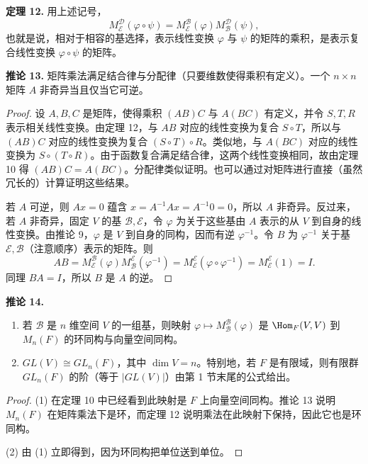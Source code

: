 \noindent\textbf{定理 12.} 用上述记号，
\[
M_{\mathcal E}^{\mathcal D}(\varphi\circ\psi)
=M_{\mathcal E}^{\mathcal B}(\varphi)M_{\mathcal B}^{\mathcal D}(\psi),
\]
也就是说，相对于相容的基选择，表示线性变换 $\varphi$ 与 $\psi$ 的矩阵的乘积，是表示复合线性变换 $\varphi\circ\psi$ 的矩阵。

\noindent\textbf{推论 13.} 矩阵乘法满足结合律与分配律（只要维数使得乘积有定义）。一个 $n\times n$ 矩阵 $A$ 非奇异当且仅当它可逆。

\begin{proof}
设 $A,B,C$ 是矩阵，使得乘积 $(AB)C$ 与 $A(BC)$ 有定义，并令 $S,T,R$ 表示相关线性变换。由定理 12，与 $AB$ 对应的线性变换为复合 $S\circ T$，所以与 $(AB)C$ 对应的线性变换为复合 $(S\circ T)\circ R$。类似地，与 $A(BC)$ 对应的线性变换为 $S\circ(T\circ R)$。由于函数复合满足结合律，这两个线性变换相同，故由定理 10 得 $(AB)C=A(BC)$。分配律类似证明。也可以通过对矩阵进行直接（虽然冗长的）计算证明这些结果。

若 $A$ 可逆，则 $Ax=0$ 蕴含 $x=A^{-1}Ax=A^{-1}0=0$，所以 $A$ 非奇异。反过来，若 $A$ 非奇异，固定 $V$ 的基 $\mathcal B,\mathcal E$，令 $\varphi$ 为关于这些基由 $A$ 表示的从 $V$ 到自身的线性变换。由推论 9，$\varphi$ 是 $V$ 到自身的同构，因而有逆 $\varphi^{-1}$。令 $B$ 为 $\varphi^{-1}$ 关于基 $\mathcal E,\mathcal B$（注意顺序）表示的矩阵。则
\[
AB=M_{\mathcal E}^{\mathcal B}(\varphi)M_{\mathcal B}^{\mathcal E}(\varphi^{-1})
=M_{\mathcal E}^{\mathcal E}(\varphi\circ\varphi^{-1})
=M_{\mathcal E}^{\mathcal E}(1)=I.
\]
同理 $BA=I$，所以 $B$ 是 $A$ 的逆。
\end{proof}

\noindent\textbf{推论 14.}
\begin{enumerate}[label=(\arabic*)]
\item 若 $\mathcal B$ 是 $n$ 维空间 $V$ 的一组基，则映射 $\varphi\mapsto M_{\mathcal B}^{\mathcal B}(\varphi)$ 是 $\Hom_F(V,V)$ 到 $M_n(F)$ 的环同构与向量空间同构。
\item $GL(V)\cong GL_n(F)$，其中 $\dim V=n$。特别地，若 $F$ 是有限域，则有限群 $GL_n(F)$ 的阶（等于 $|GL(V)|$）由第 1 节末尾的公式给出。
\end{enumerate}

\begin{proof}
(1) 在定理 10 中已经看到此映射是 $F$ 上向量空间同构。推论 13 说明 $M_n(F)$ 在矩阵乘法下是环，而定理 12 说明乘法在此映射下保持，因此它也是环同构。

(2) 由 (1) 立即得到，因为环同构把单位送到单位。
\end{proof}

